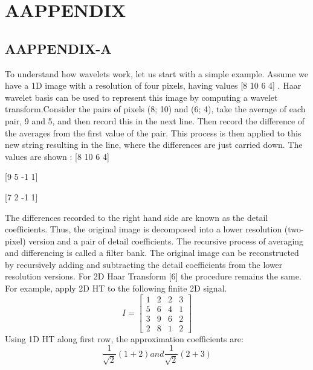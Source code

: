 \chapter*{\fontsize{16}AAPPENDIX}\label{appendix}
\section*{\fontsize{14}AAPPENDIX-A}
To understand how wavelets work, let us start with a simple example. Assume we have a 1D image with a resolution of four pixels, having values  [8 10 6 4] . Haar wavelet basis can be used to represent this image by computing a wavelet transform.Consider the pairs of pixels (8; 10) and (6; 4), take the average of each pair,  9 and 5, and then record this in the next line. Then record the difference of the averages from the first value of the pair. This process is then applied to this new string resulting in the line, where the differences are just carried down. The values are shown  : 
[8 10 6 4]

[9 5 -1 1] 

[7 2 -1 1] 

The differences recorded to the right hand side are known as the detail coefficients. Thus, the original image is decomposed into a lower resolution (two-pixel) version and a pair of detail coefficients. The recursive process of averaging and differencing is called a filter bank. The original image can be reconstructed by recursively adding and subtracting the detail coefficients from the lower resolution versions.
For 2D Haar Transform [6] the procedure remains the same. For example, apply 2D HT to the following finite 2D signal.
\[
  I=
  \left[ {\begin{array}{cccc}
  1 & 2 & 2& 3\\
  5 & 6 & 4 & 1\\
  3 & 9 & 6 & 2\\
  2 & 8 & 1 & 2
  \end{array} } \right]
\]
Using 1D HT along first row, the approximation coefficients are: 
\[ \frac{1}{\sqrt{2}}\left( 1 + 2\right) and \frac{1}{\sqrt{2}}\left( 2 + 3\right)\]

